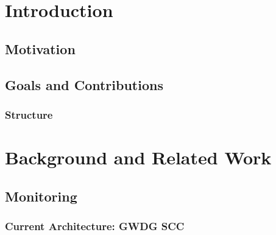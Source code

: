 \section{Introduction}
\subsection{Motivation}
\subsection{Goals and Contributions}
\subsubsection{Structure}
\section{Background and Related Work}
\subsection{Monitoring}
\subsubsection{Current Architecture: GWDG SCC}
